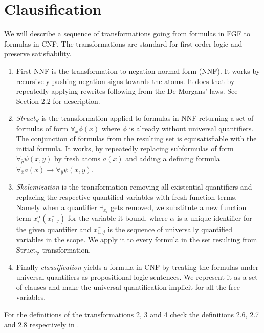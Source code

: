 \documentclass[english, shortabstract]{iithesis}
\theoremstyle{definition} \newtheorem{definition}{Definition}[chapter]
\theoremstyle{remark} \newtheorem{remark}[definition]{Observation}
\theoremstyle{plain} \newtheorem{theorem}[definition]{Theorem}
\theoremstyle{plain} \newtheorem{lemma}[definition]{Lemma}
\begin{document}
\section{Clausification}

We will describe a sequence of transformations going from formulas in FGF to formulas in CNF.
The transformations are standard for first order logic and preserve satisfiability.
\begin{enumerate}
    \item First NNF is the transformation to negation normal form (NNF). 
    It works by recursively pushing negation signs towards the atoms.
    It does that by repeatedly applying rewrites following from the De Morgans' laws. 
    See \cite{resolution book} Section 2.2 for description.
    \item \emph{Struct\textsubscript{{$\forall$}}} is the transformation applied to formulas in NNF returning a set of formulas of form $\forall_{\bar{x}}\phi(\bar{x})$ where $\phi$ is already without universal quantifiers.
    The conjunction of formulas from the resulting set is equisatisfiable with the initial formula.
    It works, by repeatedly replacing subformulas of form $\forall_{\bar{y}} \psi(\bar{x},\bar{y})$ 
    by fresh atoms $a(\bar{x})$ and adding a defining formula $\forall_{\bar{x}} a(\bar{x}) \rightarrow \forall_{\bar{y}} \psi(\bar{x},\bar{y})$.
    \item \emph{Skolemization} is the transformation removing all existential quantifiers and replacing the respective quantified variables with fresh function terms.
    Namely when a quantifier $\exists_{x_i}$ gets removed, we substitute a new function term $x_i^{\alpha}(\bar{x_{1..j}})$ for the variable it bound, 
    where $\alpha$ is a unique identifier for the given quantifier and $\bar{x_{1..j}}$ is the sequence of universally quantified variables in the scope.
    We apply it to every formula in the set resulting from Struct\textsubscript{{$\forall$}} transformation.
    \item Finally \emph{clausification} yields a formula in CNF by treating the formulas under universal quantifiers as propositional logic sentences.
    We represent it as a set of clauses and make the universal quantification implicit for all the free variables. 
\end{enumerate}

For the definitions of the transformations 2, 3 and 4 check the definitions 2.6, 2.7 and 2.8 respectively in \cite{resolution GF}.
\end{document}
